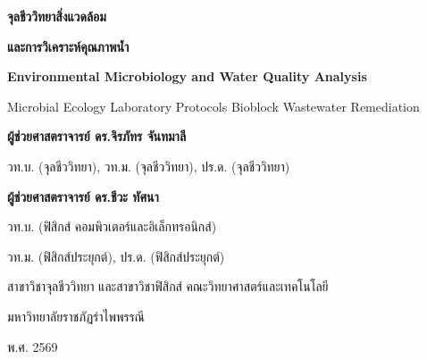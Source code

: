 \thispagestyle{empty}
\begin{center}
    \vspace*{1.5cm}
    
    {\Huge\bfseries\color{waterNavy} จุลชีววิทยาสิ่งแวดล้อม\par}
    \vspace{0.4cm}
    {\LARGE\bfseries\color{oceanTeal} และการวิเคราะห์คุณภาพน้ำ\par}
    
    \vspace{0.6cm}
    {\large\bfseries\color{microEmerald} Environmental Microbiology and Water Quality Analysis\par}
    \vspace{0.2cm}
    {\normalsize\color{slateGrey} Microbial Ecology \enspace\textbullet\enspace Laboratory Protocols \enspace\textbullet\enspace Bioblock Wastewater Remediation\par}

    \vspace{2.2cm}
    
    {\Large\bfseries ผู้ช่วยศาสตราจารย์ ดร.จิรภัทร จันทมาลี\par}
    \vspace{0.2cm}
    {\large วท.บ. (จุลชีววิทยา), วท.ม. (จุลชีววิทยา), ปร.ด. (จุลชีววิทยา)\par}
    
    \vspace{0.8cm}
    {\Large\bfseries ผู้ช่วยศาสตราจารย์ ดร.ชีวะ ทัศนา\par}
    \vspace{0.2cm}
    {\large วท.บ. (ฟิสิกส์ คอมพิวเตอร์และอิเล็กทรอนิกส์)\par}
    {\large วท.ม. (ฟิสิกส์ประยุกต์), ปร.ด. (ฟิสิกส์ประยุกต์)\par}
    
    \vfill
    
    {\large สาขาวิชาจุลชีววิทยา และสาขาวิชาฟิสิกส์ คณะวิทยาศาสตร์และเทคโนโลยี\par}
    {\large มหาวิทยาลัยราชภัฏรำไพพรรณี\par}
    \vspace{0.4cm}
    {\large พ.ศ. 2569\par}
    \vspace*{1.0cm}
\end{center}
\clearpage
